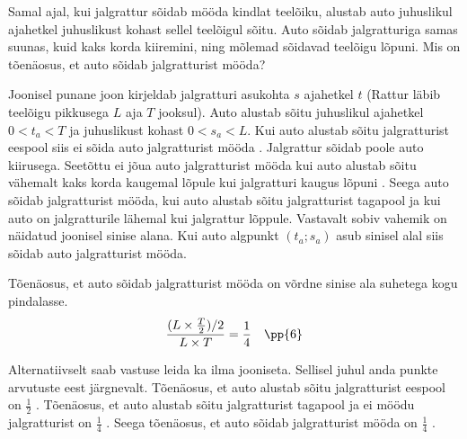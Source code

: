 
Samal ajal, kui jalgrattur sõidab mööda kindlat teelõiku, alustab auto juhuslikul ajahetkel juhuslikust kohast sellel teelõigul sõitu. Auto sõidab jalgratturiga samas suunas, kuid kaks korda kiiremini, ning mõlemad sõidavad teelõigu lõpuni. Mis on tõenäosus, et auto sõidab jalgratturist mööda?


\hint

\solu
Joonisel punane joon kirjeldab jalgratturi asukohta $s$ ajahetkel $t$ (Rattur läbib teelõigu pikkusega $L$ aja $T$ jooksul). Auto alustab sõitu juhuslikul ajahetkel $0 < t_a < T$ ja juhuslikust kohast $0 < s_a < L$. Kui auto alustab sõitu jalgratturist eespool siis ei sõida auto jalgratturist mööda . Jalgrattur sõidab poole auto kiirusega. Seetõttu ei jõua auto jalgratturist mööda kui auto alustab sõitu vähemalt kaks korda kaugemal lõpule kui jalgratturi kaugus lõpuni . Seega auto sõidab jalgratturist mööda, kui auto alustab sõitu jalgratturist tagapool ja kui auto on jalgratturile lähemal kui jalgrattur lõppule. Vastavalt sobiv vahemik on näidatud joonisel sinise alana. Kui auto algpunkt $(t_a; s_a)$ asub sinisel alal siis sõidab auto jalgratturist mööda.

\begin{figure}[H]
  \centering
\end{figure}


Tõenäosus, et auto sõidab jalgratturist mööda on võrdne sinise ala suhetega kogu pindalasse.
$$\frac{(L\times \frac T2)/2}{L \times T} = \frac{1}{4} \quad \pp{6}$$

Alternatiivselt saab vastuse leida ka ilma jooniseta. Sellisel juhul anda punkte arvutuste eest järgnevalt. Tõenäosus, et auto alustab sõitu jalgratturist eespool on $\frac{1}{2}$ . Tõenäosus, et auto alustab sõitu jalgratturist tagapool ja ei möödu jalgratturist on $\frac{1}{4}$ . Seega tõenäosus, et auto sõidab jalgratturist mööda on  $\frac{1}{4}$ .
\probend